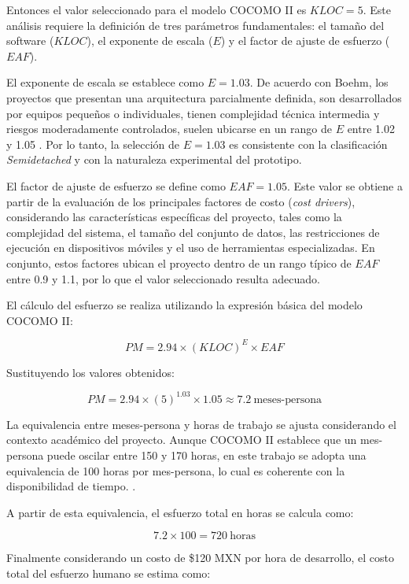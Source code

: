	
	Entonces el valor seleccionado para el modelo COCOMO II es $KLOC = 5$. Este análisis requiere la definición de tres parámetros fundamentales: el tamaño del software ($KLOC$), el exponente de escala ($E$) y el factor de ajuste de esfuerzo ($EAF$).
	
	El exponente de escala se establece como $E = 1.03$. De acuerdo con Boehm, los proyectos que presentan una arquitectura parcialmente definida, son desarrollados por equipos pequeños o individuales, tienen complejidad técnica intermedia y riesgos moderadamente controlados, suelen ubicarse en un rango de $E$ entre 1.02 y 1.05 \cite{boehm2000}. Por lo tanto, la selección de $E = 1.03$ es consistente con la clasificación \textit{Semidetached} y con la naturaleza experimental del prototipo.
	
	El factor de ajuste de esfuerzo se define como $EAF = 1.05$. Este valor se obtiene a partir de la evaluación de los principales factores de costo (\textit{cost drivers}), considerando las características específicas del proyecto, tales como la complejidad del sistema, el tamaño del conjunto de datos, las restricciones de ejecución en dispositivos móviles y el uso de herramientas especializadas. En conjunto, estos factores ubican el proyecto dentro de un rango típico de $EAF$ entre 0.9 y 1.1, por lo que el valor seleccionado resulta adecuado.
	
	El cálculo del esfuerzo se realiza utilizando la expresión básica del modelo COCOMO II:
	
	\[
	PM = 2.94 \times (KLOC)^{E} \times EAF
	\]
	
	Sustituyendo los valores obtenidos:
	
	\[
	PM = 2.94 \times (5)^{1.03} \times 1.05 \approx 7.2 \ \text{meses-persona}
	\]
	
	La equivalencia entre meses-persona y horas de trabajo se ajusta considerando el contexto académico del proyecto. Aunque COCOMO II establece que un mes-persona puede oscilar entre 150 y 170 horas, en este trabajo se adopta una equivalencia de 100 horas por mes-persona, lo cual es coherente con la disponibilidad de tiempo. \cite{boehm2000,ieee12207,pmbok2021}.
	
	A partir de esta equivalencia, el esfuerzo total en horas se calcula como:
	
	\[
	7.2 \times 100 = 720 \ \text{horas}
	\]
	
	Finalmente considerando un costo de \$120 MXN por hora de desarrollo, el costo total del esfuerzo humano se estima como:
	
